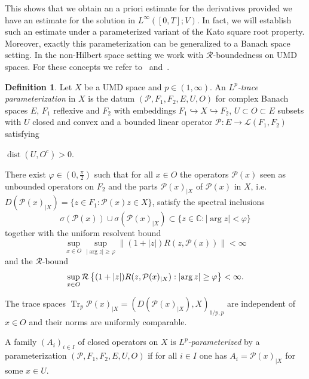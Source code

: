 \documentclass[reqno,a4paper,final]{amsart}
\numberwithin{equation}{section}
\theoremstyle{definition}
\newtheorem{definition}[lemma]{Definition}
\let\temp\phi
\let\phi\varphi
\let\varphi\temp
\begin{document}
	This shows that we obtain an a priori estimate for the derivatives provided we have an estimate for the solution in $L^{\infty}([0,T];V)$. In fact, we will establish such an estimate under a parameterized variant of the Kato square root property. Moreover, exactly this parameterization can be generalized to a Banach space setting. In the non-Hilbert space setting we work with $\mathcal{R}$-boundedness on UMD spaces. For these concepts we refer to~\cite{KunWei04} and~\cite{DHP03}.
	
	\begin{definition}\label{def:parameterized_kato}
		Let $X$ be a UMD space and $p \in (1, \infty)$. An \emph{$L^p$-trace parameterization} in $X$ is the datum $(\mathcal{P}, F_1 , F_2, E, U, O)$ for complex Banach spaces $E$, $F_1$ reflexive and $F_2$ with embeddings $F_1 \hookrightarrow X \hookrightarrow F_2$, $U \subset O \subset E$ subsets with $U$ closed and convex and a bounded linear operator $\mathcal{P}\colon E \to \mathcal{L}(F_1,F_2)$ satisfying
		\begin{def_enum}
			\item\label{trace_param:distance} $\operatorname{dist}(U, O^c) > 0$.
			\item\label{trace_param:r_boundedness} There exist $\phi \in (0,\frac{\pi}{2})$ such that for all $x \in O$ the operators $\mathcal{P}(x)$ seen as unbounded operators on $F_2$ and the parts $\mathcal{P}(x)_{|X}$ of $\mathcal{P}(x)$ in $X$, i.e.\ $D(\mathcal{P}(x)_{|X}) = \{ z \in F_1: \mathcal{P}(x)z \in X \}$, satisfy the spectral inclusions
				\begin{equation*}
					\sigma(\mathcal{P}(x)) \cup \sigma(\mathcal{P}(x)_{|X}) \subset \{ z \in {\mathbb{C}}: {\left\lvert{\arg z}\right\rvert} < \phi \}
				\end{equation*}
				together with the uniform resolvent bound 
				\begin{equation*}
					\sup_{x \in O} \sup_{{\left\lvert{\arg z}\right\rvert} \ge \phi} {\left\lVert{(1+{\left\lvert{z}\right\rvert})R(z,\mathcal{P}(x))}\right\rVert} < \infty
				\end{equation*}
				and the $\mathcal{R}$-bound
				\begin{equation*}
					\sup_{x \in O} {
	\ifthenelse{\equal{\empty}{\empty}}
		{\mathcal{R}\left\{{(1 + {\left\lvert{z}\right\rvert})R(z, \mathcal{P}(x)_{|X}): {\left\lvert{\arg z}\right\rvert} \ge \phi}\right\}}
		{\mathcal{R}_{\empty}\left\{{(1 + {\left\lvert{z}\right\rvert})R(z, \mathcal{P}(x)_{|X}): {\left\lvert{\arg z}\right\rvert} \ge \phi}\right\}}
} < \infty.
				\end{equation*}
			\item\label{trace_param:trace} The trace spaces $\operatorname{Tr}_p \mathcal{P}(x)_{|X} = (D(\mathcal{P}(x)_{|X}),X)_{1/p,p}$ are independent of $x \in O$ and their norms are uniformly comparable.
		\end{def_enum}
		A family $(A_i)_{i \in I}$ of closed operators on $X$ is \emph{$L^p$-parameterized} by a parameterization $(\mathcal{P}, F_1 , F_2, E, U, O)$ if for all $i \in I$ one has $A_i =  \mathcal{P}(x)_{|X}$ for some $x \in U$.
	\end{definition}
	
\end{document}
